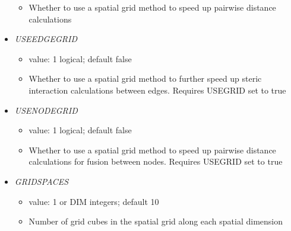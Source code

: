 \documentclass[12pt]{article}
\begin{document}
\begin{itemize}
\begin{itemize}
    \item Whether to use a spatial grid method to speed up pairwise distance calculations
  \end{itemize}
%
\item {\it USEEDGEGRID}
\begin{itemize}
  \item  value: 1 logical; default false
  \item Whether to use a spatial grid method to further speed up steric interaction calculations between edges. Requires USEGRID set to true
\end{itemize}
%
\item {\it USENODEGRID}
  \begin{itemize}
    \item  value: 1 logical; default false
    \item Whether to use a spatial grid method to speed up pairwise distance calculations for fusion between nodes. Requires USEGRID set to true
  \end{itemize}
%
\item {\it GRIDSPACES}
  \begin{itemize}
    \item  value: 1 or DIM integers; default 10
    \item Number of grid cubes in the spatial grid along each spatial dimension
  \end{itemize}
\end{itemize}
\end{document}
